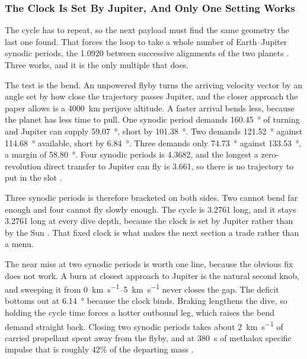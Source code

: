 \documentclass{article}
\begin{document}
\subsubsection{The Clock Is Set By Jupiter, And Only One Setting Works}\label{sec:three_synodic}
The cycle has to repeat, so the next payload must find the same geometry the last one found. That forces the loop to take a whole number of Earth--Jupiter synodic periods, the \SI{1.0920}{\year} between successive alignments of the two planets \cite{Katz_aim_is_all_you_need_2025}. Three works, and it is the only multiple that does.

The test is the bend. An unpowered flyby turns the arriving velocity vector by an angle set by how close the trajectory passes Jupiter, and the closer approach the paper allows is a \SI{4000}{\kilo\meter} perijove altitude. A faster arrival bends less, because the planet has less time to pull. One synodic period demands \SI{160.45}{\degree} of turning and Jupiter can supply \SI{59.07}{\degree}, short by \SI{101.38}{\degree}. Two demands \SI{121.52}{\degree} against \SI{114.68}{\degree} available, short by \SI{6.84}{\degree}. Three demands only \SI{74.73}{\degree} against \SI{133.53}{\degree}, a margin of \SI{58.80}{\degree}. Four synodic periods is \SI{4.3682}{\year}, and the longest a zero-revolution direct transfer to Jupiter can fly is \SI{3.661}{\year}, so there is no trajectory to put in the slot \cite{Katz_aim_is_all_you_need_2025}.

Three synodic periods is therefore bracketed on both sides. Two cannot bend far enough and four cannot fly slowly enough. The cycle is \SI{3.2761}{\year} long, and it stays \SI{3.2761}{\year} long at every dive depth, because the clock is set by Jupiter rather than by the Sun \cite{Katz_aim_is_all_you_need_2025}. That fixed clock is what makes the next section a trade rather than a menu.

The near miss at two synodic periods is worth one line, because the obvious fix does not work. A burn at closest approach to Jupiter is the natural second knob, and sweeping it from \SIrange{0}{5}{\kilo\meter\per\second} never closes the gap. The deficit bottoms out at \SI{6.14}{\degree} because the clock binds. Braking lengthens the dive, so holding the cycle time forces a hotter outbound leg, which raises the bend demand straight back. Closing two synodic periods takes about \SI{2}{\kilo\meter\per\second} of carried propellant spent away from the flyby, and at \SI{380}{\second} of methalox specific impulse that is roughly 42\% of the departing mass \cite{Katz_aim_is_all_you_need_2025}.
\end{document}
